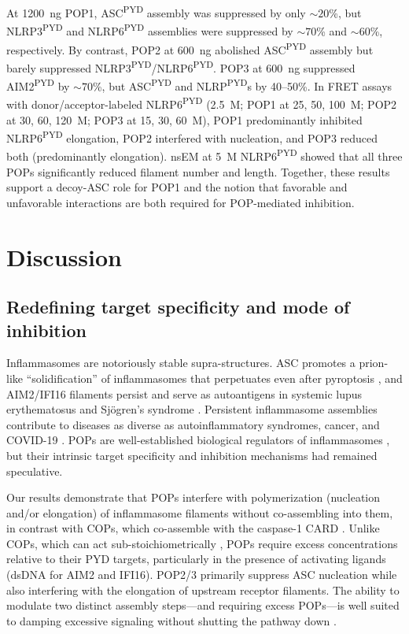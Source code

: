 \documentclass[11pt]{article}
\begin{document}
At 1200~ng POP1, ASC\textsuperscript{PYD} assembly was suppressed by only $\sim 20$\%, but NLRP3\textsuperscript{PYD} and NLRP6\textsuperscript{PYD} assemblies were suppressed by $\sim 70$\% and $\sim 60$\%, respectively. By contrast, POP2 at 600~ng abolished ASC\textsuperscript{PYD} assembly but barely suppressed NLRP3\textsuperscript{PYD}/NLRP6\textsuperscript{PYD}. POP3 at 600~ng suppressed AIM2\textsuperscript{PYD} by $\sim 70$\%, but ASC\textsuperscript{PYD} and NLRP\textsuperscript{PYD}s by 40--50\%. In FRET assays with donor/acceptor-labeled NLRP6\textsuperscript{PYD} (2.5~\textmu M; POP1 at 25, 50, 100~\textmu M; POP2 at 30, 60, 120~\textmu M; POP3 at 15, 30, 60~\textmu M), POP1 predominantly inhibited NLRP6\textsuperscript{PYD} elongation, POP2 interfered with nucleation, and POP3 reduced both (predominantly elongation). nsEM at 5~\textmu M NLRP6\textsuperscript{PYD} showed that all three POPs significantly reduced filament number and length. Together, these results support a decoy-ASC role for POP1 and the notion that favorable and unfavorable interactions are both required for POP-mediated inhibition.

\section{Discussion}
\subsection{Redefining target specificity and mode of inhibition}
Inflammasomes are notoriously stable supra-structures. ASC promotes a prion-like ``solidification'' of inflammasomes that perpetuates even after pyroptosis \citep{cai2014,franklin2014,shen2021}, and AIM2/IFI16 filaments persist and serve as autoantigens in systemic lupus erythematosus and Sj{\"o}gren's syndrome \citep{antiochos2018,antiochos2022,baer2016}. Persistent inflammasome assemblies contribute to diseases as diverse as autoinflammatory syndromes, cancer, and COVID-19 \citep{karki2017,tartey2020,vora2021}. POPs are well-established biological regulators of inflammasomes \citep{dealmeida2015,devi2020,indramohan2018,khare2014,periasamy2017,ratsimandresy2017}, but their intrinsic target specificity and inhibition mechanisms had remained speculative.

Our results demonstrate that POPs interfere with polymerization (nucleation and/or elongation) of inflammasome filaments without co-assembling into them, in contrast with COPs, which co-assemble with the caspase-1 CARD \citep{lu2016}. Unlike COPs, which can act sub-stoichiometrically \citep{lu2016}, POPs require excess concentrations relative to their PYD targets, particularly in the presence of activating ligands (dsDNA for AIM2 and IFI16). POP2/3 primarily suppress ASC nucleation while also interfering with the elongation of upstream receptor filaments. The ability to modulate two distinct assembly steps---and requiring excess POPs---is well suited to damping excessive signaling without shutting the pathway down \citep{bennett2018,meizlish2021}.
\end{document}
